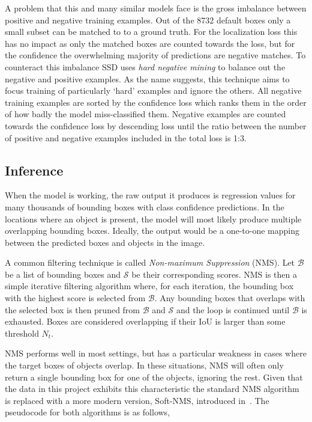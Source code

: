 A problem that this and many similar models face is the gross imbalance between positive and negative training examples.
Out of the 8732 default boxes only a small subset can be matched to to a ground truth.
For the localization loss this has no impact as only the matched boxes are counted towards the loss, but for the confidence the overwhelming majority of predictions are negative matches.
To counteract this imbalance SSD uses \textit{hard negative mining} to balance out the negative and positive examples.
As the name suggests, this technique aims to focus training of particularly `hard' examples and ignore the others.
All negative training examples are sorted by the confidence loss which ranks them in the order of how badly the model miss-classified them.
Negative examples are counted towards the confidence loss by descending loss until the ratio between the number of positive and negative examples included in the total loss is 1:3.

\subsection{Inference}

When the model is working, the raw output it produces is regression values for many thousands of bounding boxes with class confidence predictions.
In the locations where an object is present, the model will most likely produce multiple overlapping bounding boxes.
Ideally, the output would be a one-to-one mapping between the predicted boxes and objects in the image.

A common filtering technique is called \textit{Non-maximum Suppression} (NMS).
Let \( \mathcal{B} \) be a list of bounding boxes and \( \mathcal{S} \) be their corresponding scores.
NMS is then a simple iterative filtering algorithm where, for each iteration, the bounding box with the highest score is selected from \(\mathcal{B}\).
Any bounding boxes that overlaps with the selected box is then pruned from \(\mathcal{B}\) and \(\mathcal{S}\) and the loop is continued until \(\mathcal{B}\) is exhausted.
Boxes are considered overlapping if their IoU is larger than some threshold \(N_t\).

NMS performs well in most settings, but has a particular weakness in cases where the target boxes of objects overlap.
In these situations, NMS will often only return a single bounding box for one of the objects, ignoring the rest.
Given that the data in this project exhibits this characteristic the standard NMS algorithm is replaced with a more modern version, Soft-NMS, introduced in\ \textcite{bodla2017softnms}.
The pseudocode for both algorithms is as follows,

